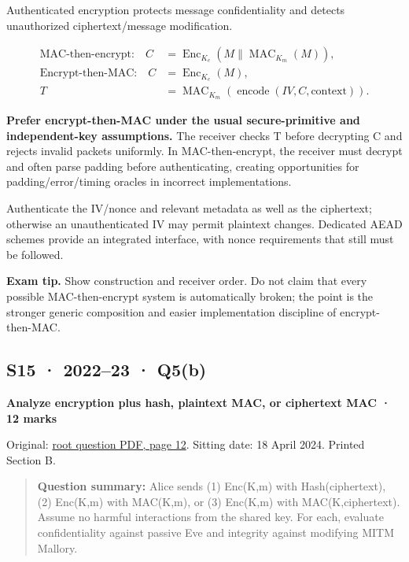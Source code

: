 \documentclass[11pt,a4paper]{article}
\begin{document}
Authenticated encryption protects message confidentiality and detects unauthorized ciphertext/\allowbreak{}message modification.



\[
\begin{aligned}\text{MAC-then-encrypt:}\quad C&=\operatorname{Enc}_{K_e}\!\left(M\parallel\operatorname{MAC}_{K_m}(M)\right),\\\text{Encrypt-then-MAC:}\quad C&=\operatorname{Enc}_{K_e}(M),\\T&=\operatorname{MAC}_{K_m}\!\left(\operatorname{encode}(IV,C,\text{context})\right).\end{aligned}
\]

\textbf{Prefer encrypt-then-MAC under the usual secure-primitive and independent-key assumptions.} The receiver checks T before decrypting C and rejects invalid packets uniformly. In MAC-then-encrypt,\allowbreak{} the receiver must decrypt and often parse padding before authenticating,\allowbreak{} creating opportunities for padding/\allowbreak{}error/\allowbreak{}timing oracles in incorrect implementations.


Authenticate the IV/\allowbreak{}nonce and relevant metadata as well as the ciphertext; otherwise an unauthenticated IV may permit plaintext changes. Dedicated AEAD schemes provide an integrated interface,\allowbreak{} with nonce requirements that still must be followed.



{\color{ForestGreen}\textbf{Exam tip.} Show construction and receiver order. Do not claim that every possible MAC-then-encrypt system is automatically broken; the point is the stronger generic composition and easier implementation discipline of encrypt-then-MAC.}




\clearpage
\subsection{S15 · 2022–23 · Q5(b)}\label{s15}

\textbf{Analyze encryption plus hash,\allowbreak{} plaintext MAC,\allowbreak{} or ciphertext MAC · 12 marks}


Original: \href{../../CSE405-Security_Merged.pdf\#page=12}{root question PDF,\allowbreak{} page 12}. Sitting date: 18 April 2024. Printed Section B.



\begin{quote}\small

\textbf{Question summary:} Alice sends (1) Enc(K,\allowbreak{}m) with Hash(ciphertext),\allowbreak{} (2) Enc(K,\allowbreak{}m) with MAC(K,\allowbreak{}m),\allowbreak{} or (3) Enc(K,\allowbreak{}m) with MAC(K,\allowbreak{}ciphertext). Assume no harmful interactions from the shared key. For each,\allowbreak{} evaluate confidentiality against passive Eve and integrity against modifying MITM Mallory.



\end{quote}
\end{document}
